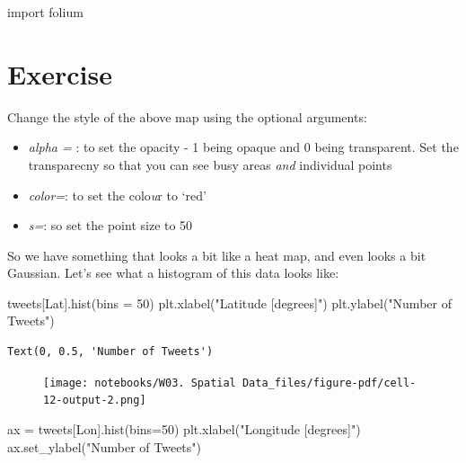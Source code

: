 \documentclass[
  letterpaper,
  DIV=11,
  numbers=noendperiod]{scrreprt}
\newenvironment{Shaded}{\begin{snugshade}}{\end{snugshade}}
\newcommand{\DecValTok}[1]{\textcolor[rgb]{0.68,0.00,0.00}{#1}}
\newcommand{\ImportTok}[1]{\textcolor[rgb]{0.00,0.46,0.62}{#1}}
\newcommand{\NormalTok}[1]{\textcolor[rgb]{0.00,0.23,0.31}{#1}}
\newcommand{\OperatorTok}[1]{\textcolor[rgb]{0.37,0.37,0.37}{#1}}
\newcommand{\StringTok}[1]{\textcolor[rgb]{0.13,0.47,0.30}{#1}}
\providecommand{\tightlist}{%
  \setlength{\itemsep}{0pt}\setlength{\parskip}{0pt}}\usepackage{longtable,booktabs,array}
\begin{document}
\begin{Shaded}
\begin{Highlighting}[]
\ImportTok{import}\NormalTok{ folium}
\end{Highlighting}
\end{Shaded}

\hypertarget{exercise-7}{%
\section{Exercise}\label{exercise-7}}

Change the style of the above map using the optional arguments:

\begin{itemize}
\tightlist
\item
  \emph{alpha = }: to set the opacity - 1 being opaque and 0 being
  transparent. Set the transparecny so that you can see busy areas
  \emph{and} individual points
\item
  \emph{color=}: to set the colo\emph{u}r to `red'
\item
  \emph{s=}: so set the point size to 50
\end{itemize}

So we have something that looks a bit like a heat map, and even looks a
bit Gaussian. Let's see what a histogram of this data looks like:

\begin{Shaded}
\begin{Highlighting}[]
\NormalTok{tweets[}\StringTok{\textquotesingle{}Lat\textquotesingle{}}\NormalTok{].hist(bins }\OperatorTok{=} \DecValTok{50}\NormalTok{)}
\NormalTok{plt.xlabel(}\StringTok{"Latitude [degrees]"}\NormalTok{)}
\NormalTok{plt.ylabel(}\StringTok{"Number of Tweets"}\NormalTok{)}
\end{Highlighting}
\end{Shaded}

\begin{verbatim}
Text(0, 0.5, 'Number of Tweets')
\end{verbatim}

\begin{figure}[H]

{\centering \texttt{[image: notebooks/W03. Spatial Data\_files/figure-pdf/cell-12-output-2.png]}

}

\end{figure}

\begin{Shaded}
\begin{Highlighting}[]
\NormalTok{ax }\OperatorTok{=}\NormalTok{ tweets[}\StringTok{\textquotesingle{}Lon\textquotesingle{}}\NormalTok{].hist(bins}\OperatorTok{=}\DecValTok{50}\NormalTok{)}
\NormalTok{plt.xlabel(}\StringTok{"Longitude [degrees]"}\NormalTok{)}
\NormalTok{ax.set\_ylabel(}\StringTok{"Number of Tweets"}\NormalTok{)}
\end{Highlighting}
\end{Shaded}
\end{document}

